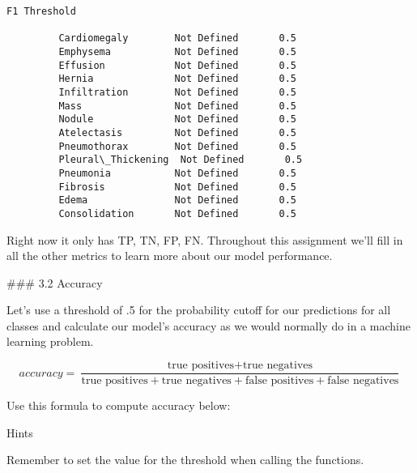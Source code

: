 \documentclass[11pt]{article}
\begin{document}
\begin{Verbatim}[commandchars=\\\{\}]
                                      F1 Threshold  
                                                    
         Cardiomegaly        Not Defined       0.5  
         Emphysema           Not Defined       0.5  
         Effusion            Not Defined       0.5  
         Hernia              Not Defined       0.5  
         Infiltration        Not Defined       0.5  
         Mass                Not Defined       0.5  
         Nodule              Not Defined       0.5  
         Atelectasis         Not Defined       0.5  
         Pneumothorax        Not Defined       0.5  
         Pleural\_Thickening  Not Defined       0.5  
         Pneumonia           Not Defined       0.5  
         Fibrosis            Not Defined       0.5  
         Edema               Not Defined       0.5  
         Consolidation       Not Defined       0.5  
\end{Verbatim}
            
    Right now it only has TP, TN, FP, FN. Throughout this assignment we'll
fill in all the other metrics to learn more about our model performance.

     \#\#\# 3.2 Accuracy

    Let's use a threshold of .5 for the probability cutoff for our
predictions for all classes and calculate our model's accuracy as we
would normally do in a machine learning problem.

\[accuracy = \frac{\text{true positives} + \text{true negatives}}{\text{true positives} + \text{true negatives} + \text{false positives} + \text{false negatives}}\]

Use this formula to compute accuracy below:

     Hints

Remember to set the value for the threshold when calling the functions.
\end{document}
